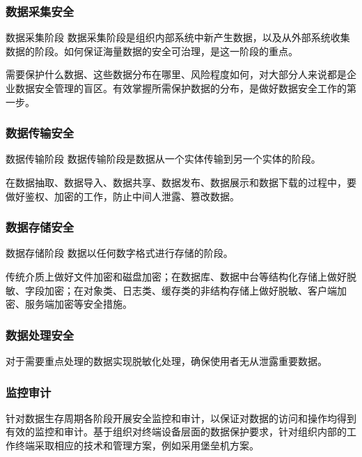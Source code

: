 \documentclass{beamer}
\begin{document}
	\begin{frame}
		\frametitle{数据采集安全}
		\begin{block}{数据采集阶段}
			数据采集阶段是组织内部系统中新产生数据，以及从外部系统收集数据的阶段。如何保证海量数据的安全可治理，是这一阶段的重点。
		\end{block}
		\quad
		需要保护什么数据、这些数据分布在哪里、风险程度如何，对大部分人来说都是企业数据安全管理的盲区。有效掌握所需保护数据的分布，是做好数据安全工作的第一步。
	\end{frame}
	
	\begin{frame}
		\frametitle{数据传输安全}
		\begin{block}{数据传输阶段}
			数据传输阶段是数据从一个实体传输到另一个实体的阶段。
		\end{block}
		\quad
		在数据抽取、数据导入、数据共享、数据发布、数据展示和数据下载的过程中，要做好鉴权、加密的工作，防止中间人泄露、篡改数据。
	\end{frame}
	
	\begin{frame}
	\frametitle{数据存储安全}
	\begin{block}{数据存储阶段}
		数据以任何数字格式进行存储的阶段。
	\end{block}
	\quad
	传统介质上做好文件加密和磁盘加密；在数据库、数据中台等结构化存储上做好脱敏、字段加密；在对象类、日志类、缓存类的非结构存储上做好脱敏、客户端加密、服务端加密等安全措施。
	\end{frame}

	\begin{frame}
	\frametitle{数据处理安全}
	\quad
	对于需要重点处理的数据实现脱敏化处理，确保使用者无从泄露重要数据。
	\end{frame}

	\begin{frame}
	\frametitle{监控审计}
	\quad
	针对数据生存周期各阶段开展安全监控和审计，以保证对数据的访问和操作均得到有效的监控和审计。基于组织对终端设备层面的数据保护要求，针对组织内部的工作终端采取相应的技术和管理方案，例如采用堡垒机方案。
	\end{frame}
	
\end{document}
